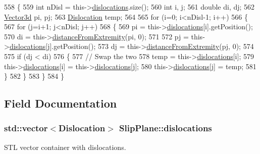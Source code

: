 \begin{DoxyCode}
558 \{
559   \textcolor{keywordtype}{int} nDisl = this->\hyperlink{classSlipPlane_ad92c7c409f7e161db449528389180910}{dislocations}.size();
560   \textcolor{keywordtype}{int} i, j;
561   \textcolor{keywordtype}{double} di, dj;
562   \hyperlink{classVector3d}{Vector3d} pi, pj;
563   \hyperlink{classDislocation}{Dislocation} temp;
564 
565   \textcolor{keywordflow}{for} (i=0; i<nDisl-1; i++)
566     \{
567       \textcolor{keywordflow}{for} (j=i+1; j<nDisl; j++)
568         \{
569           pi = this->\hyperlink{classSlipPlane_ad92c7c409f7e161db449528389180910}{dislocations}[i].getPosition();
570           di = this->\hyperlink{classSlipPlane_a3523030cccb520b5253a811d062f3ddf}{distanceFromExtremity}(pi, 0);
571           
572           pj = this->\hyperlink{classSlipPlane_ad92c7c409f7e161db449528389180910}{dislocations}[j].getPosition();
573           dj = this->\hyperlink{classSlipPlane_a3523030cccb520b5253a811d062f3ddf}{distanceFromExtremity}(pj, 0);
574           
575           \textcolor{keywordflow}{if} (dj < di)
576             \{
577               \textcolor{comment}{// Swap the two}
578               temp = this->\hyperlink{classSlipPlane_ad92c7c409f7e161db449528389180910}{dislocations}[i];
579               this->\hyperlink{classSlipPlane_ad92c7c409f7e161db449528389180910}{dislocations}[i] = this->\hyperlink{classSlipPlane_ad92c7c409f7e161db449528389180910}{dislocations}[j];
580               this->\hyperlink{classSlipPlane_ad92c7c409f7e161db449528389180910}{dislocations}[j] = temp;
581             \}
582         \}
583     \}
584 \}
\end{DoxyCode}


\subsection{Field Documentation}
\hypertarget{classSlipPlane_ad92c7c409f7e161db449528389180910}{
\subsubsection[{dislocations}]{\setlength{\rightskip}{0pt plus 5cm}std\-::vector$<${\bf Dislocation}$>$ Slip\-Plane\-::dislocations\hspace{0.3cm}{\ttfamily [protected]}}}\label{db/d25/classSlipPlane_ad92c7c409f7e161db449528389180910}


S\-T\-L vector container with dislocations. 

